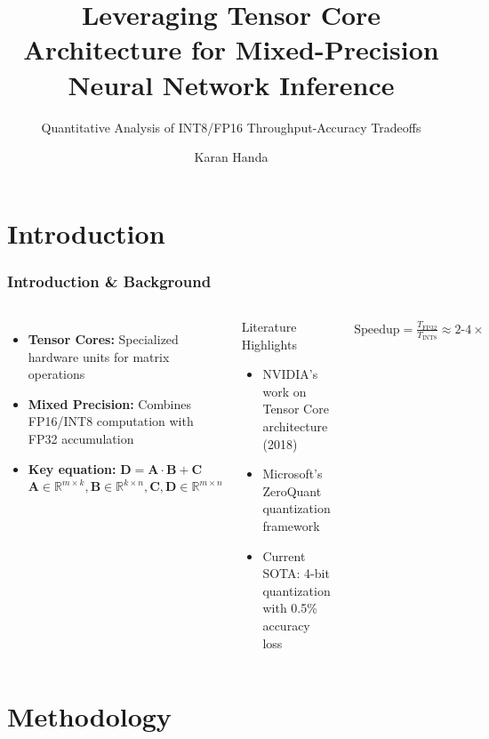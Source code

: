 \documentclass[
    9pt,
    aspectratio=169,
]{beamer}
\title[Tensor Core Optimization]{Leveraging Tensor Core Architecture for Mixed-Precision Neural Network Inference}
\subtitle[Quantization Effects]{Quantitative Analysis of INT8/FP16 Throughput-Accuracy Tradeoffs}
\author[Karan Handa]{Karan Handa}
\institute[]{Department of Computer Science, Ashoka University}
\begin{document}
\begin{frame}
\titlepage
\end{frame}

\section{Introduction}

\begin{frame}
\frametitle{Introduction \& Background}
\begin{columns}
\begin{itemize}
    \item \textbf{Tensor Cores:} Specialized hardware units for matrix operations
    \item \textbf{Mixed Precision:} Combines FP16/INT8 computation with FP32 accumulation
    \item \textbf{Key equation:} $\mathbf{D} = \mathbf{A} \cdot \mathbf{B} + \mathbf{C}$ \quad {} $\mathbf{A} \in \mathbb{R}^{m \times k}, \mathbf{B} \in \mathbb{R}^{k \times n}, \mathbf{C}, \mathbf{D} \in \mathbb{R}^{m \times n}$
\end{itemize}

\begin{block}{Literature Highlights}
    \begin{itemize}
        \item NVIDIA's work on Tensor Core architecture (2018)
        \item Microsoft's ZeroQuant quantization framework
        \item Current SOTA: 4-bit quantization with 0.5\% accuracy loss
    \end{itemize}
\end{block}

\begin{align}
    \text{Speedup} = \frac{T_{\text{FP32}}}{T_{\text{INT8}}} \approx 2\text{-}4\times
\end{align}

\end{columns}
\end{frame}

\section{Methodology}
\end{document}
